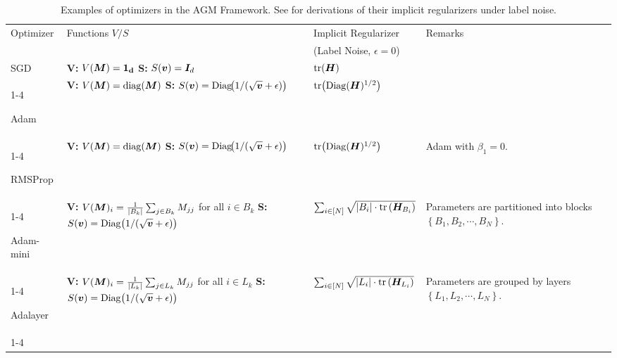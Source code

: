 \begin{table}[t]
  \centering
  \begingroup
  \scriptsize
  \caption{\small Examples of optimizers in the AGM Framework. See  for derivations of their implicit regularizers under label noise.}
  \label{tab:agms}
  \begin{tabular}{m{1.15cm}|m{5.25cm}|m{3.1cm}|m{3.2cm}}
    \toprule
    \multirow{2}{*}{Optimizer} & \multirow{2}{*}{Functions $V/S$} & Implicit Regularizer & \multirow{2}{*}{Remarks} \\
    & & (Label Noise, $\epsilon = 0$) \\
    \midrule

    SGD
    & \textbf{V: } $V({\bm{M}})=\mathbf{1_d}$ \newline
      \textbf{S: } $S({\bm{v}})={\bm{I}}_d$
    & $\text{tr}\!\left({\bm{H}}\right)$~\citep{blanc2020implicit}
    & \\
    \cmidrule{1-4}

    Adam
    & \textbf{V: } $V({\bm{M}})=\mathrm{diag}({\bm{M}})$ \newline
      \textbf{S: } $S({\bm{v}})=\mathrm{Diag}\!\bigl(1/(\sqrt{{\bm{v}}}+\epsilon)\bigr)$
    & $\text{tr}\!\left(\mathrm{Diag}({\bm{H}})^{1/2}\right)$
    & \\
    \cmidrule{1-4}

    RMSProp
    & \textbf{V: } $V({\bm{M}})=\mathrm{diag}({\bm{M}})$ \newline
      \textbf{S: } $S({\bm{v}})=\mathrm{Diag}\!\bigl(1/(\sqrt{{\bm{v}}}+\epsilon)\bigr)$
    & $\text{tr}\!\left(\mathrm{Diag}({\bm{H}})^{1/2}\right)$
    & Adam with $\beta_1 = 0$. \\
    \cmidrule{1-4}

    Adam-mini
    & \textbf{V: } $V({\bm{M}})_i =\frac{1}{|B_k|}\sum_{j\in B_k}M_{jj}$ for all $i \in B_k$ \newline
      \textbf{S: } $S({\bm{v}})=\mathrm{Diag}\bigl(1/(\sqrt{{\bm{v}}}+\epsilon)\bigr)$
    & $\sum_{i \in [N]} \sqrt{|B_i| \cdot \text{tr}\left({\bm{H}}_{B_i}\right)}$
    & Parameters are partitioned into blocks $\left\{B_1, B_2, \cdots, B_N\right\}$. \\
    \cmidrule{1-4}

    Adalayer
    & \textbf{V: } $V({\bm{M}})_i =\frac{1}{|L_k|}\sum_{j\in L_k}M_{jj}$ for all $i \in L_k$ \newline
      \textbf{S: } $S({\bm{v}})=\mathrm{Diag}\bigl(1/(\sqrt{{\bm{v}}}+\epsilon)\bigr)$
    & $\sum_{i \in [N]} \sqrt{|L_i| \cdot \text{tr} \left({\bm{H}}_{L_i}\right)}$
    & Parameters are grouped by layers $\left\{L_1, L_2, \cdots, L_N\right\}$. \\
    \cmidrule{1-4}    
    

\end{tabular}
\end{table}
